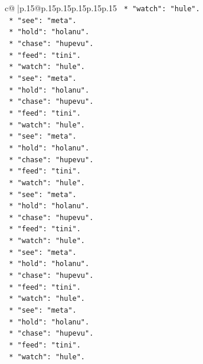 \documentclass{article}
\begin{document}
{\begin{supertabular}{c@{$\;$}|p{.15\linewidth}@{}p{.15\linewidth}p{.15\linewidth}p{.15\linewidth}p{.15\linewidth}p{.15\linewidth}}
{{{\texttt{            *   "watch": "hule".} \\
\texttt{            *   "see": "meta".} \\
\texttt{            *   "hold": "holanu".} \\
\texttt{            *   "chase": "hupevu".} \\
\texttt{            *   "feed": "tini".} \\
\texttt{            *   "watch": "hule".} \\
\texttt{            *   "see": "meta".} \\
\texttt{            *   "hold": "holanu".} \\
\texttt{            *   "chase": "hupevu".} \\
\texttt{            *   "feed": "tini".} \\
\texttt{            *   "watch": "hule".} \\
\texttt{            *   "see": "meta".} \\
\texttt{            *   "hold": "holanu".} \\
\texttt{            *   "chase": "hupevu".} \\
\texttt{            *   "feed": "tini".} \\
\texttt{            *   "watch": "hule".} \\
\texttt{            *   "see": "meta".} \\
\texttt{            *   "hold": "holanu".} \\
\texttt{            *   "chase": "hupevu".} \\
\texttt{            *   "feed": "tini".} \\
\texttt{            *   "watch": "hule".} \\
\texttt{            *   "see": "meta".} \\
\texttt{            *   "hold": "holanu".} \\
\texttt{            *   "chase": "hupevu".} \\
\texttt{            *   "feed": "tini".} \\
\texttt{            *   "watch": "hule".} \\
\texttt{            *   "see": "meta".} \\
\texttt{            *   "hold": "holanu".} \\
\texttt{            *   "chase": "hupevu".} \\
\texttt{            *   "feed": "tini".} \\
\texttt{            *   "watch": "hule".} \\
}}}
\end{supertabular}}
\end{document}
